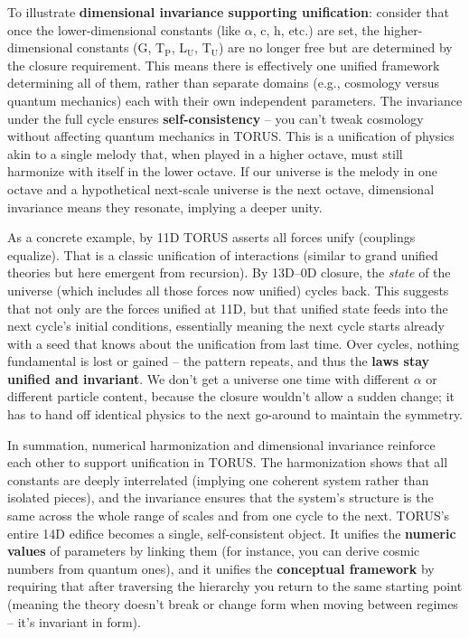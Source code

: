 \documentclass[]{article}
\newcommand{\subscript}[1]{\ensuremath{_{\mathrm{#1}}}}
\begin{document}
To illustrate \textbf{dimensional invariance supporting unification}:
consider that once the lower-dimensional constants (like $\alpha$, c, h, etc.)
are set, the higher-dimensional constants (G,
T\subscript{P},
L\subscript{U},
T\subscript{U}) are no
longer free but are determined by the closure requirement​. This means
there is effectively one unified framework determining all of them,
rather than separate domains (e.g., cosmology versus quantum mechanics)
each with their own independent parameters. The invariance under the
full cycle ensures \textbf{self-consistency} -- you can't tweak
cosmology without affecting quantum mechanics in TORUS. This is a
unification of physics akin to a single melody that, when played in a
higher octave, must still harmonize with itself in the lower octave. If
our universe is the melody in one octave and a hypothetical next-scale
universe is the next octave, dimensional invariance means they resonate,
implying a deeper unity.

As a concrete example, by 11D TORUS asserts all forces unify (couplings
equalize)​. That is a classic unification of interactions (similar to
grand unified theories but here emergent from recursion). By 13D--0D
closure, the \emph{state} of the universe (which includes all those
forces now unified) cycles back. This suggests that not only are the
forces unified at 11D, but that unified state feeds into the next
cycle's initial conditions, essentially meaning the next cycle starts
already with a seed that knows about the unification from last time.
Over cycles, nothing fundamental is lost or gained -- the pattern
repeats, and thus the \textbf{laws stay unified and invariant}. We don't
get a universe one time with different $\alpha$ or different particle content,
because the closure wouldn't allow a sudden change; it has to hand off
identical physics to the next go-around to maintain the symmetry.

In summation, numerical harmonization and dimensional invariance
reinforce each other to support unification in TORUS. The harmonization
shows that all constants are deeply interrelated (implying one coherent
system rather than isolated pieces), and the invariance ensures that the
system's structure is the same across the whole range of scales and from
one cycle to the next. TORUS's entire 14D edifice becomes a single,
self-consistent object. It unifies the \textbf{numeric values} of
parameters by linking them (for instance, you can derive cosmic numbers
from quantum ones), and it unifies the \textbf{conceptual framework} by
requiring that after traversing the hierarchy you return to the same
starting point (meaning the theory doesn't break or change form when
moving between regimes -- it's invariant in form).
\end{document}
